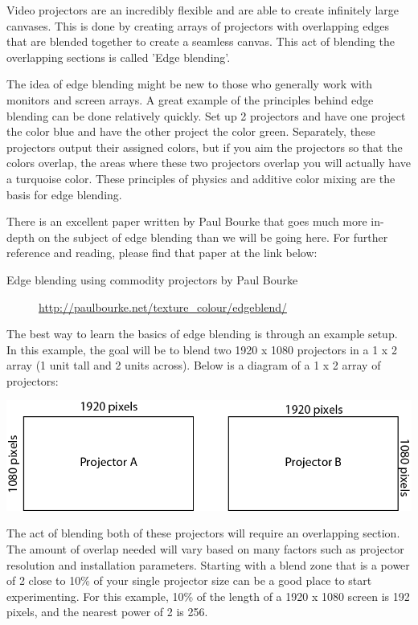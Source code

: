 \begin{fullwidth}
Video projectors are an incredibly flexible and are able to create infinitely large canvases. This is done by creating arrays of projectors with overlapping edges that are blended together to create a seamless canvas. This act of blending the overlapping sections is called 'Edge blending'.

The idea of edge blending might be new to those who generally work with monitors and screen arrays. A great example of the principles behind edge blending can be done relatively quickly. Set up 2 projectors and have one project the color blue and have the other project the color green. Separately, these projectors output their assigned colors, but if you aim the projectors so that the colors overlap, the areas where these two projectors overlap you will actually have a turquoise color. These principles of physics and additive color mixing are the basis for edge blending.

There is an excellent paper written by Paul Bourke that goes much more in-depth on the subject of edge blending than we will be going here. For further reference and reading, please find that paper at the link below:

\begin{description}
\item[Edge blending using commodity projectors by Paul Bourke] \url{http://paulbourke.net/texture_colour/edgeblend/}
\end{description}

The best way to learn the basics of edge blending is through an example setup. In this example, the goal will be to blend two 1920 x 1080 projectors in a 1 x 2 array (1 unit tall and 2 units across). Below is a diagram of a 1 x 2 array of projectors:

\begin{center}
\includegraphics{./img/10.5/blending_layout.png}
\end{center}

The act of blending both of these projectors will require an overlapping section. The amount of overlap needed will vary based on many factors such as projector resolution and installation parameters. Starting with a blend zone that is a power of 2 close to 10\% of your single projector size can be a good place to start experimenting. For this example, 10\% of the length of a 1920 x 1080 screen is 192 pixels, and the nearest power of 2 is 256. 


\end{fullwidth}
